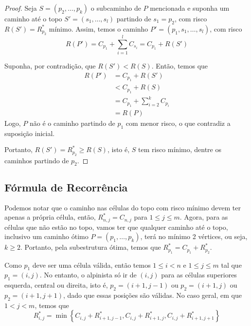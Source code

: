 \begin{proof}
    Seja $S = \left(p_2, \ldots, p_k\right)$ o subcaminho de $P$ mencionada e suponha um caminho até o topo $S' = \left(s_1, \ldots, s_l\right)$ partindo de $s_1 = p_2$, com risco $R(S') = R^*_{p_2}$ mínimo. Assim, temos o caminho $P' = \left(p_1, s_1, \ldots, s_l\right)$, com risco
    \[
        R(P') = C_{p_1} + \sum_{i = 1}^l C_{s_i} = C_{p_1} + R(S')
    \]

    Suponha, por contradição, que $R(S') < R(S)$. Então, temos que
    \begin{align*}
        R(P') &= C_{p_1} + R(S')  \\
            &< C_{p_1} + R(S) \\
            &= C_{p_1} + \sum_{i = 2}^{k} C_{p_i} \\
            &= R(P)
    \end{align*}
    Logo, $P$ não é o caminho partindo de $p_1$ com menor risco, o que contradiz a suposição inicial.

    Portanto, $R(S') = R^*_{p_2} \geq R(S)$, isto é, $S$ tem risco mínimo, dentre os caminhos partindo de $p_2$.
\end{proof}

\begin{samepage}
    \subsection{Fórmula de Recorrência} \label{sec:formrec}
\end{samepage}

Podemos notar que o caminho nas células do topo com risco mínimo devem ter apenas a própria célula, então, $R^*_{n, j} = C_{n, j}$  para $1 \leq j \leq m$. Agora, para as células que não estão no topo, vamos ter que qualquer caminho até o topo, inclusivo um caminho ótimo $P = \left(p_1, \ldots, p_k\right)$, terá no mínimo 2 vértices, ou seja, $k \geq 2$. Portanto, pela subestrutura ótima, temos que $R^*_{p_1} = C_{p_1} + R^*_{p_2}$.

Como $p_1$ deve ser uma célula válida, então temos $1 \leq i < n$ e $1 \leq j \leq m$ tal que $p_1 = (i, j)$. No entanto, o alpinista só ir de $(i, j)$ para as células superiores esquerda, central ou direita, isto é, $p_2 = (i+1, j-1)$ ou $p_2 = (i+1, j)$ ou $p_2 = (i+1, j+1)$, dado que essas posições são válidas. No caso geral, em que $1 < j < m$, temos que
\[
    R^*_{i, j} = \min\left\{C_{i, j} + R^*_{i+1,j-1}, C_{i, j} + R^*_{i+1,j}, C_{i, j} + R^*_{i+1,j+1}\right\}
\]

